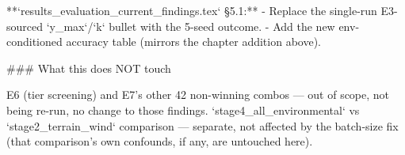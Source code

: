 **`results_evaluation_current_findings.tex` §5.1:**
- Replace the single-run E3-sourced `y_max`/`k` bullet with the 5-seed outcome.
- Add the new env-conditioned accuracy table (mirrors the chapter addition above).

### What this does NOT touch

E6 (tier screening) and E7's other 42 non-winning combos — out of scope, not being re-run, no
change to those findings. `stage4_all_environmental` vs `stage2_terrain_wind` comparison — separate,
not affected by the batch-size fix (that comparison's own confounds, if any, are untouched here).
